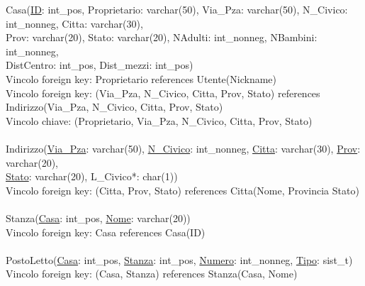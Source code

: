 \documentclass[a4paper,12pt]{report}
\begin{document}
      \hspace*{-0.75cm}
      Casa(\underline{ID}: int\_pos, Proprietario: varchar(50), Via\_Pza: varchar(50), N\_Civico: int\_nonneg, Citta: varchar(30), \\
      \hspace*{2cm}Prov: varchar(20), Stato: varchar(20), NAdulti: int\_nonneg, NBambini: int\_nonneg, \\
      \hspace*{2cm}DistCentro: int\_pos, Dist\_mezzi: int\_pos) \\
      \hspace*{1cm} Vincolo foreign key: Proprietario references Utente(Nickname) \\
      \hspace*{1cm} Vincolo foreign key: (Via\_Pza, N\_Civico, Citta, Prov, Stato) references \\
      \hspace*{2cm}Indirizzo(Via\_Pza, N\_Civico, Citta, Prov, Stato) \\
      \hspace*{1cm} Vincolo chiave: (Proprietario, Via\_Pza, N\_Civico, Citta, Prov, Stato) \\ \\

      \hspace*{-0.75cm}
      Indirizzo(\underline{Via\_Pza}: varchar(50), \underline{N\_Civico}: int\_nonneg, \underline{Citta}: varchar(30), \underline{Prov}: varchar(20), \\
      \hspace*{2cm}\underline{Stato}: varchar(20), L\_Civico*: char(1)) \\
      \hspace*{1cm} Vincolo foreign key: (Citta, Prov, Stato) references Citta(Nome, Provincia Stato) \\ \\

      \hspace*{-0.75cm}
      Stanza(\underline{Casa}: int\_pos, \underline{Nome}: varchar(20)) \\
      \hspace*{1cm} Vincolo foreign key: Casa references Casa(ID) \\ \\

      \hspace*{-0.75cm}
      PostoLetto(\underline{Casa}: int\_pos, \underline{Stanza}: int\_pos, \underline{Numero}: int\_nonneg, \underline{Tipo}: sist\_t) \\
      \hspace*{1cm} Vincolo foreign key: (Casa, Stanza) references Stanza(Casa, Nome) \\ \\
\end{document}
